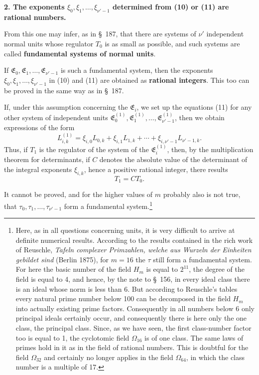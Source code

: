 \documentclass[11pt]{article}
\begin{document}
\begin{center}\textbf{2. The exponents $\xi_0,\xi_1,\ldots,\xi_{\nu'-1}$ determined from (10) or (11) are rational numbers.}\end{center}

From this one may infer, as in \S~187, that there are systems of $\nu'$ independent normal units whose regulator $T_0$ is as small as possible, and such systems are called \textbf{fundamental systems of normal units}.

If $\mathfrak E_0,\mathfrak E_1,\ldots,\mathfrak E_{\nu'-1}$ is such a fundamental system, then the exponents $\xi_0,\xi_1,\ldots,\xi_{\nu'-1}$ in (10) and (11) are obtained as \textbf{rational integers}. This too can be proved in the same way as in \S~187.

If, under this assumption concerning the $\mathfrak E_i$, we set up the equations (11) for any other system of independent units $\mathfrak E_0^{(1)},\mathfrak E_1^{(1)},\ldots,\mathfrak E_{\nu'-1}^{(1)}$, then we obtain expressions of the form
\[
L_{i,k}^{(1)}=\xi_{i,0}L_{0,k}+\xi_{i,1}L_{1,k}+\cdots+\xi_{i,\nu'-1}L_{\nu'-1,k}.
\]
Thus, if $T_1$ is the regulator of the system of the $\mathfrak E_i^{(1)}$, then, by the multiplication theorem for determinants, if $C$ denotes the absolute value of the determinant of the integral exponents $\xi_{i,k}$, hence a positive rational integer, there results
\begin{equation}
T_1=CT_0.
\tag{13}
\end{equation}

It cannot be proved, and for the higher values of $m$ probably also is not true, that $\tau_0,\tau_1,\ldots,\tau_{\nu'-1}$ form a fundamental system.\footnote{Here, as in all questions concerning units, it is very difficult to arrive at definite numerical results. According to the results contained in the rich work of Reuschle, \emph{Tafeln complexer Primzahlen, welche aus Wurzeln der Einheiten gebildet sind} (Berlin 1875), for $m=16$ the $\tau$ still form a fundamental system. For here the basic number of the field $H_m$ is equal to $2^{11}$, the degree of the field is equal to 4, and hence, by the note to \S~156, in every ideal class there is an ideal whose norm is less than 6. But according to Reuschle's tables every natural prime number below 100 can be decomposed in the field $H_m$ into actually existing prime factors. Consequently in all numbers below 6 only principal ideals certainly occur, and consequently there is here only the one class, the principal class. Since, as we have seen, the first class-number factor too is equal to 1, the cyclotomic field $\Omega_{16}$ is of one class. The same laws of primes hold in it as in the field of rational numbers. This is doubtful for the field $\Omega_{32}$ and certainly no longer applies in the field $\Omega_{64}$, in which the class number is a multiple of 17.}
\end{document}
